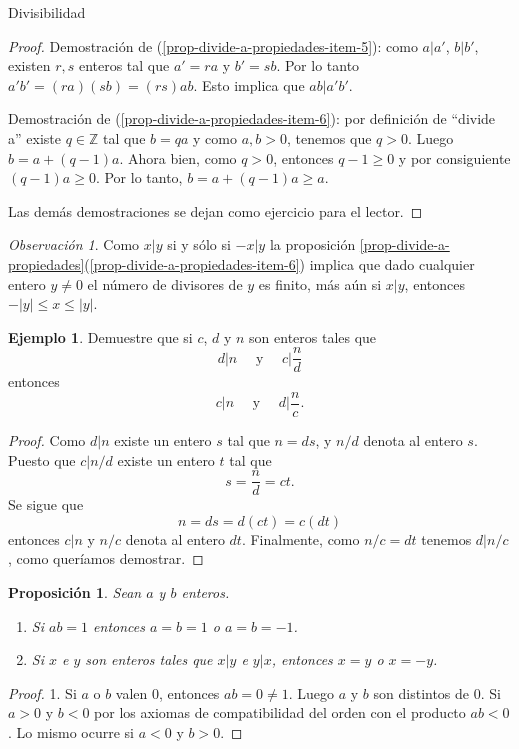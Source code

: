 \documentclass[11pt,spanish,makeidx]{amsbook}
\newtheorem{proposicion}[teorema]{Proposici\'on}
\theoremstyle{definition}
\newtheorem{ejemplo}{Ejemplo}[section]
\theoremstyle{remark}
\newtheorem{observacion}{Observaci\'on}[section]
\newcommand \ZZ{{\mathbb Z}}
\begin{document}
\begin{section}{Divisibilidad}
\begin{proof}
	Demostración de (\ref{prop-divide-a-propiedades-item-5}): como $a|a'$, $b|b'$, existen $r,s$ enteros tal que $a'=ra$ y $b' =sb$. Por lo tanto $a'b' = (ra)(sb) = (rs)ab$. Esto implica que  $ab|a'b'$.
	
	Demostración de (\ref{prop-divide-a-propiedades-item-6}): por definición de ``divide a'' existe $q \in \ZZ$ tal que $b = qa$ y como $a,b>0$,  tenemos que $q>0$. Luego $b = a + (q-1)a$. Ahora bien,  como $q >0$,  entonces $q-1 \ge0$ y por consiguiente $(q-1)a \ge 0$. Por lo tanto,  $b = a + (q-1)a \ge a$.

	Las demás demostraciones se dejan como ejercicio para el lector. 

\end{proof}



\begin{observacion}
	Como $x|y$ si y sólo si $-x|y$ la proposición  \ref{prop-divide-a-propiedades}(\ref{prop-divide-a-propiedades-item-6}) implica que dado cualquier entero $y \ne 0$ el número de divisores de  $y$ es finito,  más aún si $x|y$,  entonces $-|y| \le x \le |y|$.  
\end{observacion}



\begin{ejemplo} Demuestre que si $c$, $d$ y $n$ son enteros tales
que
$$
d|n \quad\text{ y }\quad c|\frac{n}{d}
$$
entonces
$$
c|n \quad\text{ y }\quad d|\frac{n}{c}.
$$
\end{ejemplo}
\begin{proof} Como $d|n$ existe un entero $s$ tal que $n=ds$, y $n/d$ denota al entero $s$. Puesto que $c|n/d$ existe un entero $t$ tal que
$$
s=\frac{n}{d} =ct.
$$
Se sigue que
$$
n=ds=d(ct)=c(dt)
$$
entonces $c|n$ y $n/c$ denota al entero $dt$. Finalmente, como $n/c=dt$ tenemos $d|n/c$, como queríamos demostrar.
\end{proof}


\begin{proposicion}\label{prop-pm} Sean $a$ y $b$ enteros.
\begin{enumerate}
\item Si  $ab=1$ entonces $a=b=1$ o $a=b=-1$. 
\item\label{prop-pm-2} Si $x$ e $y$ son enteros tales que $x|y$ e $y|x$, entonces $x=y$ o $x=-y$.
\end{enumerate}
\end{proposicion}
\begin{proof} 1. Si $a$ o $b$ valen 0, entonces $ab=0 \not=1$. Luego $a$ y $b$ son distintos de 0. Si $a>0$ y $b<0$ por los axiomas de compatibilidad del orden con el producto $ab<0$. Lo mismo ocurre si $a<0$ y $b>0$.


\end{proof}
\end{section}
\end{document}
